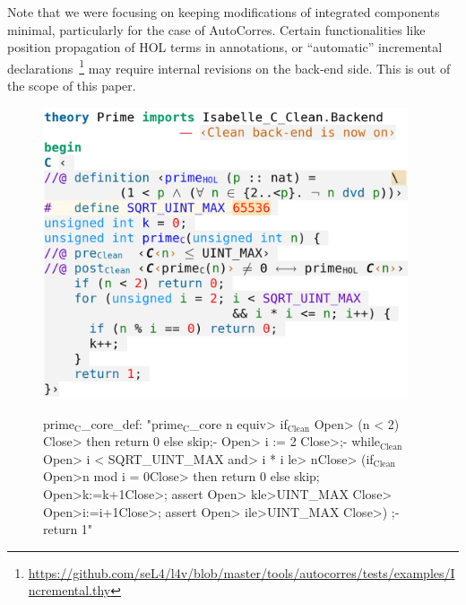 \begin{isabellebody}
\begin{isamarkuptext}
Note that we were focusing on keeping modifications of integrated components minimal, particularly
for the case of AutoCorres. Certain functionalities like position propagation of HOL terms in
annotations, or ``automatic'' incremental declarations~\footnote{\url{https://github.com/seL4/l4v/blob/master/tools/autocorres/tests/examples/Incremental.thy}}
may require internal revisions on the back-end side. This is out of the scope of this paper.%
\end{isamarkuptext}\isamarkuptrue%
%
\begin{isamarkuptext}%
\begin{figure}
  \centering
  \begin{minipage}{0.53\linewidth}
  \includegraphics[width=0.96\textwidth]{figures/A-C-Source7}
  \end{minipage}
  \begin{minipage}{0.45\linewidth}
\begin{isar}
prime$_{\text{C}}$_core_def: "prime$_{\text{C}}$_core n \<equiv>
  if$_{\text{Clean}}$ \<Open> (n < 2) \<Close> then return 0 else skip;-
  \<Open> i := 2 \<Close>;-
  while$_{\text{Clean}}$ \<Open> i < SQRT_UINT_MAX \<and> i * i \<le> n\<Close>
    (if$_{\text{Clean}}$ \<Open>n mod i = 0\<Close>
      then return 0 else skip;
     \<Open>k:=k+1\<Close>; assert \<Open> k\<le>UINT_MAX \<Close>
     \<Open>i:=i+1\<Close>; assert \<Open> i\<le>UINT_MAX \<Close>) ;-
  return 1"


\end{isar}
\end{minipage}
\end{figure}
\end{isamarkuptext}
\end{isabellebody}
